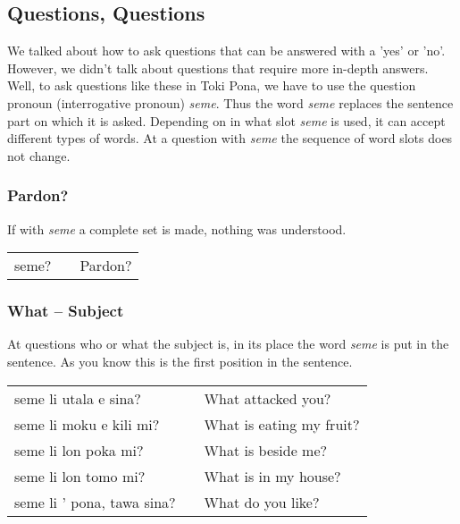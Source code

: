 \subsection*{Questions, Questions}
%
We talked about how to ask questions that can be answered with a 'yes' or 'no'. 
However, we didn't talk about questions that require more in-depth answers. 
Well, to ask questions like these in Toki Pona, we have to use the question pronoun (interrogative pronoun) \textit{seme}. 
Thus the word \textit{seme} replaces the sentence part on which it is asked. 
Depending on in what slot \textit{seme} is used, it can accept different types of words. 
At a question with \textit{seme} the sequence of word slots does not change. 
%
\subsubsection*{Pardon?}
%
If with \textit{seme} a complete set is made, nothing was understood. 

\begin{supertabular}{p{5,5cm}|ll}
seme? && Pardon? \\
\end{supertabular} 
%
\subsubsection*{What -- Subject}
%
At questions who or what the subject is, in its place the word \textit{seme} is put in the sentence.
As you know this is the first position in the sentence. 

\begin{supertabular}{p{5,5cm}|ll}
seme li utala e sina? && What attacked you? \\
seme li moku e kili mi? && What is eating my fruit? \\
seme li lon poka mi? && What is beside me? \\
seme li lon tomo mi? && What is in my house? \\
seme li ' pona, tawa sina? && What do you like? \\ 
\end{supertabular} 
%
